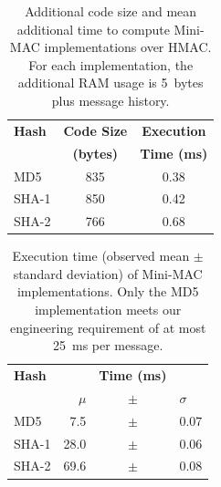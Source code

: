 \begin{table}	
	\centering	
	\caption{Additional code size and mean additional time to compute Mini-MAC implementations over HMAC.
	For each implementation, the additional RAM usage is 5~bytes plus message history.}
	\label{tab-overhead}
	\vspace{8pt}
	\begin{tabular}{l|c|c}
	\bfseries Hash & \bfseries Code Size  & \bfseries Execution\\
	& \bfseries (bytes) & \bfseries Time (ms)\\\hline 
	MD5 & 835 & 0.38 \\
	SHA-1 & 850 & 0.42 \\
	SHA-2 & 766 & 0.68 \\
	\end{tabular}
	\end{table}
	
	\begin{table}
	\centering
	\caption{Execution time (observed mean $\pm$ standard deviation) of Mini-MAC implementations.
	Only the MD5 implementation meets our engineering requirement of at most 25~ms per message.}
	\label{tab-time}
	\vspace{8pt}
	\begin{tabular}{ @{}l | rcl}
	\hspace{2pt}\textbf{Hash} && {\textbf{Time (ms)}}&\\
		& $\mu$ & $\pm$ & $\sigma$   \\
		\hline 
		\hspace{2pt}MD5 	& 7.5 		& $\pm$ 	& 0.07 \\
		\hspace{2pt}SHA-1 	& 28.0 		& $\pm$		& 0.06 \\
		\hspace{2pt}SHA-2 	& 69.6 		& $\pm$		& 0.08 \\ 
	\end{tabular}	
	\end{table}
	
